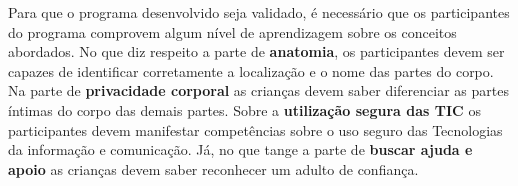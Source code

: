 Para que o programa desenvolvido seja validado, é necessário que os participantes do programa comprovem algum nível de aprendizagem sobre os conceitos abordados. No que diz respeito a parte de \textbf{anatomia}, os participantes devem ser capazes de identificar corretamente a localização e o nome das partes do corpo. Na parte de \textbf{privacidade corporal} as crianças devem saber diferenciar as partes íntimas do corpo das demais partes. Sobre a \textbf{utilização segura das TIC} os participantes devem manifestar competências sobre o uso seguro das Tecnologias da informação e comunicação. Já, no que tange a parte de \textbf{buscar ajuda e apoio} as crianças devem saber reconhecer um adulto de confiança.


\newpage

